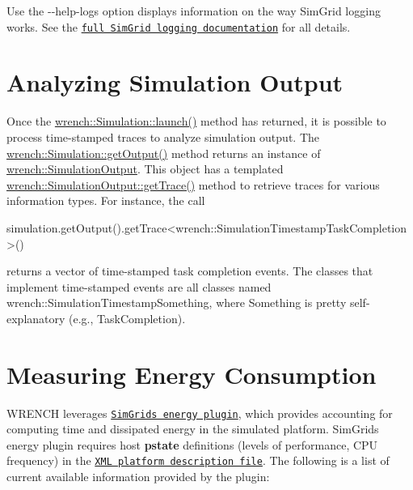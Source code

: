 Use the {\ttfamily -\/-\/help-\/logs} option displays information on the way Sim\+Grid logging works. See the \href{http://simgrid.gforge.inria.fr/simgrid/latest/doc/outcomes_logs.html}{\tt full Sim\+Grid logging documentation} for all details.\hypertarget{wrench-101_wrench-101-simulation-output}{}\section{Analyzing Simulation Output}\label{wrench-101_wrench-101-simulation-output}
Once the {\ttfamily \hyperlink{classwrench_1_1_simulation_ae9589632de9a2311ed1d7f7747478985}{wrench\+::\+Simulation\+::launch()}} method has returned, it is possible to process time-\/stamped traces to analyze simulation output. The {\ttfamily \hyperlink{classwrench_1_1_simulation_aff0338aa6831c6ac252cf0673fe68f44}{wrench\+::\+Simulation\+::get\+Output()}} method returns an instance of {\ttfamily \hyperlink{classwrench_1_1_simulation_output}{wrench\+::\+Simulation\+Output}}. This object has a templated {\ttfamily \hyperlink{classwrench_1_1_simulation_output_a1d03324f34db985d0e181e42cf30cd9d}{wrench\+::\+Simulation\+Output\+::get\+Trace()}} method to retrieve traces for various information types. For instance, the call 
\begin{DoxyCode}
simulation.getOutput().getTrace<wrench::SimulationTimestampTaskCompletion>()
\end{DoxyCode}
 returns a vector of time-\/stamped task completion events. The classes that implement time-\/stamped events are all classes named {\ttfamily wrench\+::\+Simulation\+Timestamp\+Something}, where {\ttfamily Something} is pretty self-\/explanatory (e.\+g., {\ttfamily Task\+Completion}).\hypertarget{wrench-101_wrench-101-energy}{}\section{Measuring Energy Consumption}\label{wrench-101_wrench-101-energy}
W\+R\+E\+N\+CH leverages \href{http://simgrid.gforge.inria.fr/simgrid/latest/doc/group__plugin__energy.html}{\tt Sim\+Grid\textquotesingle{}s energy plugin}, which provides accounting for computing time and dissipated energy in the simulated platform. Sim\+Grid\textquotesingle{}s energy plugin requires host {\bfseries pstate} definitions (levels of performance, C\+PU frequency) in the \href{http://simgrid.gforge.inria.fr/simgrid/latest/doc/platform.html}{\tt X\+ML platform description file}. The following is a list of current available information provided by the plugin\+:


